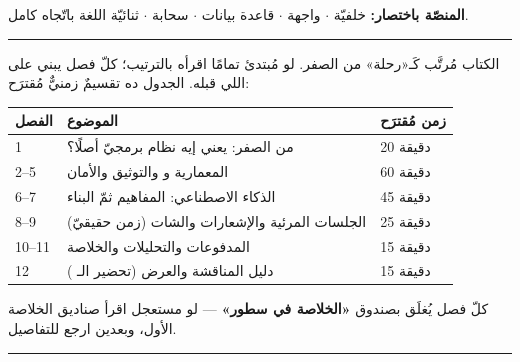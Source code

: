 \documentclass[12pt,a4paper]{article}
\begin{document}

\vspace{6pt}
{\small\color{spInk}
\textbf{المنصّة باختصار:}  خلفيّة  $\cdot$
 واجهة  $\cdot$  قاعدة بيانات $\cdot$
 سحابة $\cdot$ ثنائيّة اللغة  باتّجاه  كامل.}

\vspace{4pt}\hrule height 0.4pt\vspace{8pt}

\begin{summary}
الكتاب مُرتَّب كَـ«رحلة» من الصفر. لو مُبتدئ تمامًا اقرأه بالترتيب؛ كلّ فصل
يبني على اللي قبله. الجدول ده تقسيمٌ زمنيٌّ مُقترَح:
\begin{center}
\begin{tabular}{C{1.7cm} L{7.4cm} C{2.4cm}}
\toprule
\textbf{الفصل} & \textbf{الموضوع} & \textbf{زمن مُقترَح} \\
 & من الصفر: يعني إيه نظام برمجيّ أصلًا؟ & 20 دقيقة \\
2--5 & المعمارية و والتوثيق والأمان & 60 دقيقة \\
6--7 & الذكاء الاصطناعي: المفاهيم ثمّ البناء & 45 دقيقة \\
8--9 & الجلسات المرئية والإشعارات والشات (زمن حقيقيّ) & 25 دقيقة \\
10--11 & المدفوعات والتحليلات والخلاصة & 15 دقيقة \\
12 & دليل المناقشة والعرض (تحضير الـ ) & 15 دقيقة \\
\bottomrule
\end{tabular}
\end{center}
كلّ فصل يُغلَق بصندوق \textbf{«الخلاصة في سطور»} — لو مستعجل اقرأ صناديق
الخلاصة الأول، وبعدين ارجع للتفاصيل.
\end{summary}

\vspace{4pt}
{\small\tableofcontents}
\vspace{4pt}\hrule height 0.4pt

\clearpage

\clearpage

\clearpage

\clearpage

\clearpage

\clearpage

\clearpage

\clearpage

\clearpage

\clearpage

\clearpage

\end{document}
